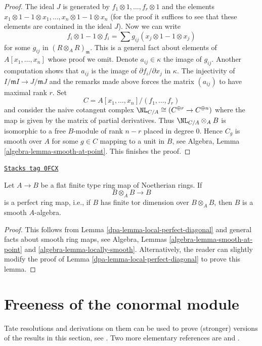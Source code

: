 \begin{proof}
\medskip\noindent
The ideal $J$ is generated by $f_1 \otimes 1, \ldots, f_r \otimes 1$
and the elements $x_1 \otimes 1 - 1 \otimes x_1, \ldots,
x_n \otimes 1 - 1 \otimes x_n$ (for the proof it suffices to
see that these elements are contained in the ideal $J$).
Now we can write
$$
f_i \otimes 1 - 1 \otimes f_i =
\sum g_{ij} (x_j \otimes 1 - 1 \otimes x_j)
$$
for some $g_{ij}$ in $(R \otimes_A R)_\mathfrak m$. This is a general
fact about elements of $A[x_1, \ldots, x_n]$ whose proof we omit.
Denote $a_{ij} \in \kappa$ the image of $g_{ij}$. Another computation
shows that $a_{ij}$ is the image of $\partial f_i / \partial x_j$ in $\kappa$.
The injectivity of $I/\mathfrak m I \to J/\mathfrak m J$ and the remarks
made above forces the matrix $(a_{ij})$ to have maximal rank $r$.
Set
$$
C = A[x_1, \ldots, x_n]/(f_1, \ldots, f_r)
$$
and consider the naive cotangent complex
$\NL_{C/A} \cong (C^{\oplus r} \to C^{\oplus n})$
where the map is given by the matrix of partial derivatives.
Thus $\NL_{C/A} \otimes_A B$
is isomorphic to a free $B$-module of rank $n - r$ placed in degree $0$.
Hence $C_g$ is smooth over $A$ for some $g \in C$ mapping to a unit
in $B$, see Algebra, Lemma \ref{algebra-lemma-smooth-at-point}.
This finishes the proof.
\end{proof}

\begin{lemma}
\label{dpa-lemma-perfect-diagonal}
\href{https://stacks.math.columbia.edu/tag/0FCX}{\texttt{Stacks tag 0FCX}}

Let $A \to B$ be a flat finite type ring map of Noetherian rings. If
$$
B \otimes_A B \longrightarrow B
$$
is a perfect ring map, i.e., if $B$ has finite tor dimension over
$B \otimes_A B$, then $B$ is a smooth $A$-algebra.
\end{lemma}

\begin{proof}

This follows from Lemma \ref{dpa-lemma-local-perfect-diagonal}
and general facts about smooth ring maps, see
Algebra, Lemmas \ref{algebra-lemma-smooth-at-point} and
\ref{algebra-lemma-locally-smooth}.
Alternatively, the reader can slightly modify the proof of
Lemma \ref{dpa-lemma-local-perfect-diagonal} to prove
this lemma.
\end{proof}

\section{Freeness of the conormal module}
\label{dpa-section-freeness-conormal}
Tate resolutions and derivations on them can be used to prove
(stronger) versions of the results in this section, see \cite{Iyengar}.
Two more elementary references are
\cite{Vasconcelos} and \cite{Ferrand-lci}.

